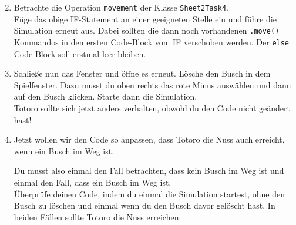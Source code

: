 \begin{enumerate} \setcounter{enumi}{1}
    \item Betrachte die Operation \lstinline{movement} der Klasse \lstinline{Sheet2Task4}.\\
    Füge das obige IF-Statement an einer geeigneten Stelle ein und führe die Simulation erneut aus.
    Dabei sollten die dann noch vorhandenen \lstinline{.move()} Kommandos in den ersten Code-Block vom IF verschoben werden.
    Der \lstinline{else} Code-Block soll erstmal leer bleiben.
    \item Schließe nun das Fenster und öffne es erneut.
    Lösche den Busch in dem Spielfenster.
    Dazu musst du oben rechts das rote Minus auswählen und dann auf den Busch klicken.
    Starte dann die Simulation.\\
    Totoro sollte sich jetzt anders verhalten, obwohl du den Code nicht geändert hast!
    \item Jetzt wollen wir den Code so anpassen, dass Totoro die Nuss auch erreicht, wenn ein Busch im Weg ist.
    
    Du musst also einmal den Fall betrachten, dass kein Busch im Weg ist und einmal den Fall, dass ein Busch im Weg ist.\\
    
    Überprüfe deinen Code, indem du einmal die Simulation startest, ohne den Busch zu löschen und einmal wenn du den Busch davor gelöscht hast.
    In beiden Fällen sollte Totoro die Nuss erreichen.

\end{enumerate}
